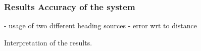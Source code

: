 \begin{frame} \frametitle{Results Accuracy of the system}
- usage of two different heading sources
- error wrt to distance

Interpretation of the results.
\end{frame}